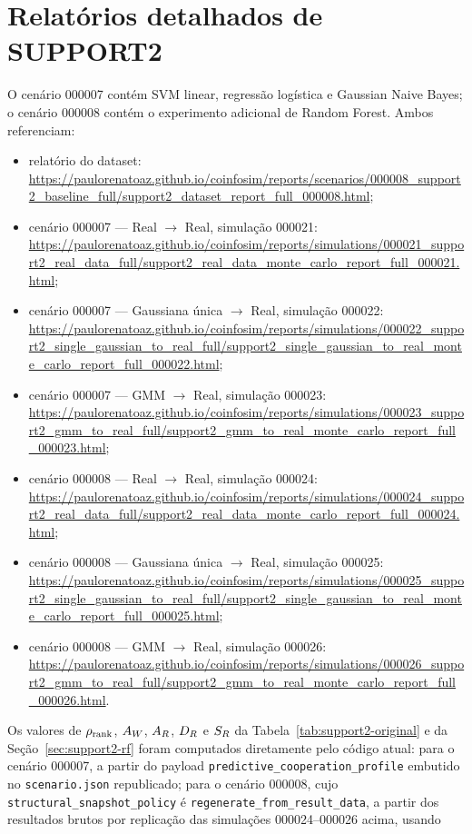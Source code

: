 \section{Relatórios detalhados de SUPPORT2}

O cenário 000007 contém SVM linear, regressão logística e Gaussian Naive Bayes; o cenário 000008 contém o experimento adicional de Random Forest. Ambos referenciam:

\begin{itemize}
  \item relatório do dataset: \url{https://paulorenatoaz.github.io/coinfosim/reports/scenarios/000008_support2_baseline_full/support2_dataset_report_full_000008.html};
  \item cenário 000007 --- Real $\rightarrow$ Real, simulação 000021: \url{https://paulorenatoaz.github.io/coinfosim/reports/simulations/000021_support2_real_data_full/support2_real_data_monte_carlo_report_full_000021.html};
  \item cenário 000007 --- Gaussiana única $\rightarrow$ Real, simulação 000022: \url{https://paulorenatoaz.github.io/coinfosim/reports/simulations/000022_support2_single_gaussian_to_real_full/support2_single_gaussian_to_real_monte_carlo_report_full_000022.html};
  \item cenário 000007 --- GMM $\rightarrow$ Real, simulação 000023: \url{https://paulorenatoaz.github.io/coinfosim/reports/simulations/000023_support2_gmm_to_real_full/support2_gmm_to_real_monte_carlo_report_full_000023.html};
  \item cenário 000008 --- Real $\rightarrow$ Real, simulação 000024: \url{https://paulorenatoaz.github.io/coinfosim/reports/simulations/000024_support2_real_data_full/support2_real_data_monte_carlo_report_full_000024.html};
  \item cenário 000008 --- Gaussiana única $\rightarrow$ Real, simulação 000025: \url{https://paulorenatoaz.github.io/coinfosim/reports/simulations/000025_support2_single_gaussian_to_real_full/support2_single_gaussian_to_real_monte_carlo_report_full_000025.html};
  \item cenário 000008 --- GMM $\rightarrow$ Real, simulação 000026: \url{https://paulorenatoaz.github.io/coinfosim/reports/simulations/000026_support2_gmm_to_real_full/support2_gmm_to_real_monte_carlo_report_full_000026.html}.
\end{itemize}

Os valores de $\rho_{\mathrm{rank}}$, $A_W$, $A_R$, $D_R$ e $S_R$ da Tabela~\ref{tab:support2-original} e da Seção~\ref{sec:support2-rf} foram computados diretamente pelo código atual: para o cenário 000007, a partir do payload \texttt{predictive\_\allowbreak cooperation\_\allowbreak profile} embutido no \texttt{scenario.json} republicado; para o cenário 000008, cujo \texttt{structural\_\allowbreak snapshot\_\allowbreak policy} é \texttt{regenerate\_\allowbreak from\_\allowbreak result\_\allowbreak data}, a partir dos resultados brutos por replicação das simulações 000024--000026 acima, usando

